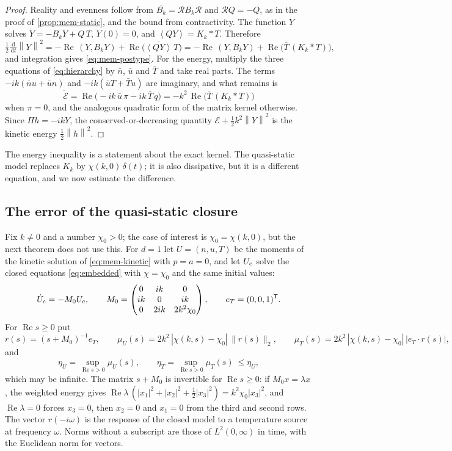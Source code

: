 \documentclass[11pt]{article}
\newcommand{\dd}{\,\mathrm d}
\newcommand{\av}[1]{\left\langle #1\right\rangle}
\newcommand{\Real}{\operatorname{Re}}
\newcommand{\norm}[1]{\left\|#1\right\|}
\theoremstyle{definition}
\theoremstyle{remark}
\numberwithin{equation}{section}
\begin{document}
\begin{proof}
Reality and evenness follow from
$\overline{B_k}=\mathcal RB_k\mathcal R$ and $\mathcal RQ=-Q$, as in the
proof of \cref{prop:mem-static}, and the bound from contractivity. The
function $Y$ solves $\dot Y=-B_kY+Q\,T$, $Y(0)=0$, and
$\av{QY}=K_k*T$. Therefore
\[
 \tfrac12\tfrac{\dd}{\dd t}\norm Y^2
 =-\Real\,(Y,B_kY)+\Real\bigl(\overline{\av{QY}}\,T\bigr)
 =-\Real\,(Y,B_kY)+\Real\bigl(\overline T\,(K_k*T)\bigr),
\]
and integration gives \eqref{eq:mem-postype}. For the energy, multiply the
three equations of \eqref{eq:hierarchy} by $\bar n$, $\bar u$ and
$\bar T$ and take real parts. The terms $-ik(\bar nu+\bar un)$ and
$-ik(\bar uT+\bar Tu)$ are imaginary, and what remains is
\[
 \dot{\mathcal E}=\Real\bigl(-ik\,\bar u\,\pi-ik\,\bar T\,q\bigr)
 =-k^2\,\Real\bigl(\overline T\,(K_k*T)\bigr)
\]
when $\pi=0$, and the analogous quadratic form of the matrix kernel
otherwise. Since $\Pi h=-ikY$, the conserved-or-decreasing quantity
$\mathcal E+\tfrac12k^2\norm Y^2$ is the kinetic energy
$\tfrac12\norm h^2$.
\end{proof}

The energy inequality is a statement about the exact kernel. The
quasi-static model replaces $K_k$ by $\chi(k,0)\,\delta(t)$; it is also
dissipative, but it is a different equation, and we now estimate the
difference.

\subsection{The error of the quasi-static closure}

Fix $k\ne0$ and a number $\chi_0>0$; the case of interest is
$\chi_0=\chi(k,0)$, but the next theorem does not use this. For $d=1$ let
$U=(n,u,T)$ be the moments of the kinetic solution of
\eqref{eq:mem-kinetic} with $p=a=0$, and let $U_{\rm c}$ solve the closed
equations \eqref{eq:embedded} with $\chi=\chi_0$ and the same initial
values:
\[
 \dot U_{\rm c}=-M_0U_{\rm c},\qquad
 M_0=\begin{pmatrix}0&ik&0\\ ik&0&ik\\ 0&2ik&2k^2\chi_0\end{pmatrix},
 \qquad e_T=(0,0,1)^{\mathsf T}.
\]
For $\Real s\geq0$ put
\begin{equation}
 r(s)=(s+M_0)^{-1}e_T,\qquad
 \mu_U(s)=2k^2\,|\chi(k,s)-\chi_0|\,\|r(s)\|_2,\qquad
 \mu_T(s)=2k^2\,|\chi(k,s)-\chi_0|\,|e_T\cdot r(s)| ,
 \label{eq:mem-mu}
\end{equation}
and
\[
 \eta_U=\sup_{\Real s>0}\mu_U(s),\qquad
 \eta_T=\sup_{\Real s>0}\mu_T(s)\ \leq\eta_U ,
\]
which may be infinite. The matrix $s+M_0$ is invertible for
$\Real s\geq0$: if $M_0x=\lambda x$, the weighted energy gives
$\Real\lambda\,(|x_1|^2+|x_2|^2+\tfrac12|x_3|^2)=k^2\chi_0|x_3|^2$, and
$\Real\lambda=0$ forces $x_3=0$, then $x_2=0$ and $x_1=0$ from the third
and second rows. The vector $r(-i\omega)$ is the response of the closed
model to a temperature source at frequency $\omega$. Norms without a
subscript are those of $L^2(0,\infty)$ in time, with the Euclidean norm
for vectors.
\end{document}
